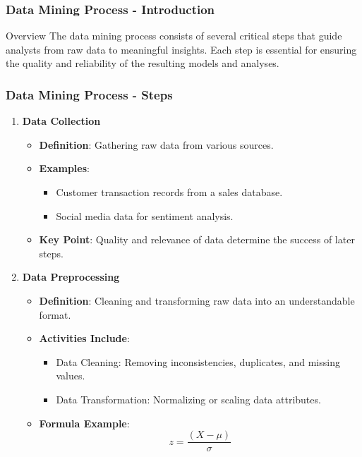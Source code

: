 \documentclass[aspectratio=169]{beamer}
\begin{document}
\begin{frame}[fragile]
    \frametitle{Data Mining Process - Introduction}
    \begin{block}{Overview}
        The data mining process consists of several critical steps that guide analysts from raw data to meaningful insights. Each step is essential for ensuring the quality and reliability of the resulting models and analyses.
    \end{block}
\end{frame}

\begin{frame}[fragile]
    \frametitle{Data Mining Process - Steps}
    \begin{enumerate}
        \item \textbf{Data Collection}
        \begin{itemize}
            \item \textbf{Definition}: Gathering raw data from various sources.
            \item \textbf{Examples}:
            \begin{itemize}
                \item Customer transaction records from a sales database.
                \item Social media data for sentiment analysis.
            \end{itemize}
            \item \textbf{Key Point}: Quality and relevance of data determine the success of later steps.
        \end{itemize}

        \item \textbf{Data Preprocessing}
        \begin{itemize}
            \item \textbf{Definition}: Cleaning and transforming raw data into an understandable format.
            \item \textbf{Activities Include}:
            \begin{itemize}
                \item Data Cleaning: Removing inconsistencies, duplicates, and missing values.
                \item Data Transformation: Normalizing or scaling data attributes.
            \end{itemize}
            \item \textbf{Formula Example}:
            \begin{equation}
                z = \frac{(X - \mu)}{\sigma}
            \end{equation}
        \end{itemize}
    \end{enumerate}
\end{frame}
\end{document}
